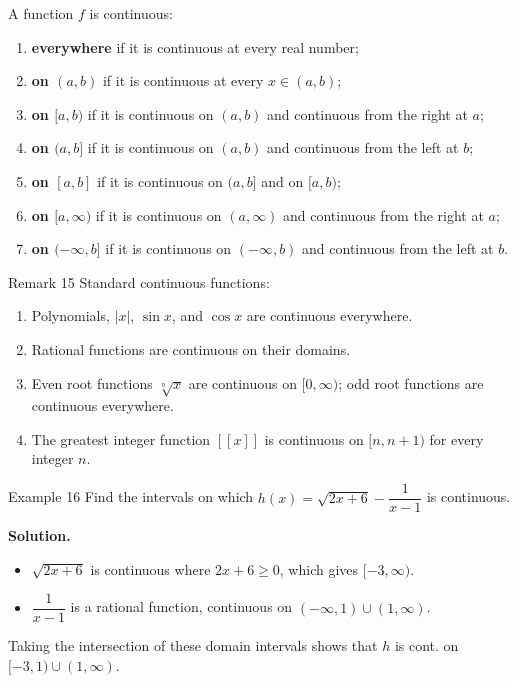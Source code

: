 A function \(f\) is continuous:
\begin{enumerate}
    \item \textbf{everywhere} if it is continuous at every real number;
    \item \textbf{on \((a, b)\)} if it is continuous at every \(x \in (a, b)\);
    \item \textbf{on \([a, b)\)} if it is continuous on \((a, b)\) and continuous from the right at \(a\);
    \item \textbf{on \((a, b]\)} if it is continuous on \((a, b)\) and continuous from the left at \(b\);
    \item \textbf{on \([a, b]\)} if it is continuous on \((a, b]\) and on \([a, b)\);
    \item \textbf{on \([a, \infty)\)} if it is continuous on \((a, \infty)\) and continuous from the right at \(a\);
    \item \textbf{on \((-\infty, b]\)} if it is continuous on \((-\infty, b)\) and continuous from the left at \(b\).
\end{enumerate}

\begin{remarkbox}{Remark 15}
Standard continuous functions:
\begin{enumerate}
    \item Polynomials, \(|x|\), \(\sin x\), and \(\cos x\) are continuous everywhere.
    \item Rational functions are continuous on their domains.
    \item Even root functions \(\sqrt[n]{x}\) are continuous on \([0, \infty)\); odd root functions are continuous everywhere.
    \item The greatest integer function \([\![x]\!]\) is continuous on \([n, n+1)\) for every integer \(n\).
\end{enumerate}
\end{remarkbox}

\begin{examplebox}{Example 16}
Find the intervals on which \(h(x) = \sqrt{2x + 6} - \dfrac{1}{x - 1}\) is continuous.

\medskip
\textbf{Solution.}
\begin{itemize}
    \item \(\sqrt{2x + 6}\) is continuous where \(2x + 6 \ge 0\), which gives \([-3, \infty)\).
    \item \(\dfrac{1}{x - 1}\) is a rational function, continuous on \((-\infty, 1) \cup (1, \infty)\).
\end{itemize}
Taking the intersection of these domain intervals shows that \(h\) is cont. on \([-3, 1) \cup (1, \infty)\).
\end{examplebox}


